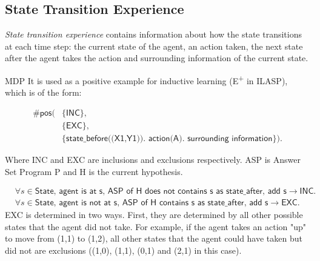 \subsection{State Transition Experience}
\textit{State transition experience} contains information about how the state transitions at each time step: the current state of the agent,
an action taken, the next state after the agent takes the action and surrounding information of the current state.

MDP
It is used as a positive example for inductive learning (E\textsuperscript{+} in ILASP), which is of the form:

\begin{equation}
\begin{split}
\textsf{\#pos(} & \textsf{\{INC\}},\\
& \{\textsf{EXC}\}, \\
& \{\textsf{state\_before((X1,Y1)). action(A). surrounding information}\}).
\end{split}
\end{equation}

Where INC and EXC are inclusions and exclusions respectively. ASP is Answer Set Program P and H is the current hypothesis.

\begin{equation}
\begin{split}
    &\forall s \in \textsf{State, agent is at s, ASP of H does not contains s as state\_after, add s} \rightarrow \textsf{INC.} \\
    & \forall s \in \textsf{State, agent is not at s, ASP of H contains s as state\_after, add s} \rightarrow \textsf{EXC.}
\end{split}
\end{equation}
EXC is determined in two ways. First, they are determined by all other possible states that the agent did not take.
For example, if the agent takes an action "up" to move from (1,1) to (1,2), all other states that the agent could have taken but did not are exclusions ((1,0), (1,1), (0,1) and (2,1) in this case).

